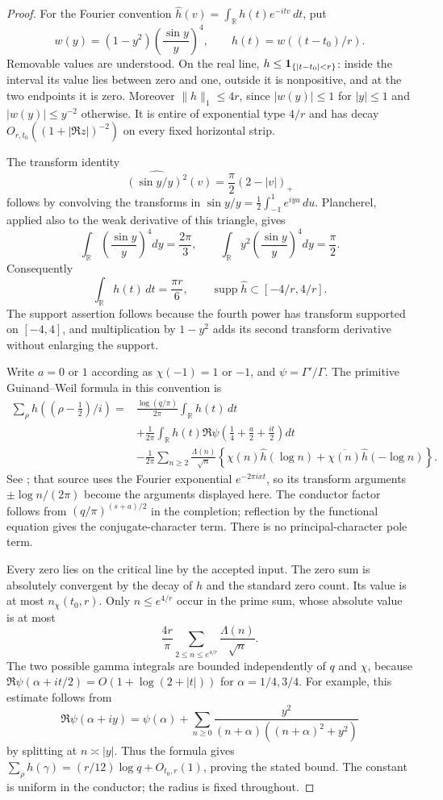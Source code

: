 \begin{proof}
For the Fourier convention
$\widehat h(v)=\int_{\mathbb R}h(t)e^{-itv}\,dt$, put
\[
 w(y)=(1-y^2)\left(\frac{\sin y}{y}\right)^4,\qquad
 h(t)=w((t-t_0)/r).
\]
Removable values are understood. On the real line,
$h\le{\bf1}_{\{|t-t_0|<r\}}$: inside the interval its value
lies between zero and one, outside it is nonpositive, and at
the two endpoints it is zero. Moreover $\|h\|_1\le4r$, since
$|w(y)|\le1$ for $|y|\le1$ and $|w(y)|\le y^{-2}$ otherwise.
It is entire of exponential type $4/r$ and has decay
$O_{r,t_0}((1+|\Re z|)^{-2})$ on every fixed horizontal strip.

The transform identity
\[
 \widehat{(\sin y/y)^2}(v)=\frac\pi2(2-|v|)_+
\]
follows by convolving the transforms in
$\sin y/y=\frac12\int_{-1}^1e^{iyu}\,du$.
Plancherel, applied also to the weak derivative of this
triangle, gives
\[
 \int_{\mathbb R}\left(\frac{\sin y}{y}\right)^4dy
   =\frac{2\pi}{3},\qquad
 \int_{\mathbb R}y^2\left(\frac{\sin y}{y}\right)^4dy
   =\frac\pi2.
\]
Consequently
\[
 \int_{\mathbb R}h(t)\,dt=\frac{\pi r}{6},\qquad
 \operatorname{supp}\widehat h\subset[-4/r,4/r].
\]
The support assertion follows because the fourth power has
transform supported on $[-4,4]$, and multiplication by
$1-y^2$ adds its second transform derivative without
enlarging the support.

Write $a=0$ or $1$ according as $\chi(-1)=1$ or $-1$, and
$\psi=\Gamma'/\Gamma$. The primitive Guinand--Weil formula
in this convention is
\begin{align*}
 \sum_\rho h((\rho-\tfrac12)/i)
 ={}&\frac{\log(q/\pi)}{2\pi}\int_{\mathbb R}h(t)\,dt\\
 &+\frac1{2\pi}\int_{\mathbb R}h(t)
       \Re\psi\left(\frac14+\frac a2+\frac{it}{2}\right)dt\\
 &-\frac1{2\pi}\sum_{n\ge2}\frac{\Lambda(n)}{\sqrt n}
   \left\{\chi(n)\widehat h(\log n)
       +\overline{\chi(n)}\widehat h(-\log n)\right\}.
\end{align*}
See \cite[Section~2.1, equation~(2.1), p.~3]{chirre-pereira-delaat2021};
that source uses the Fourier exponential $e^{-2\pi ixt}$,
so its transform arguments $\pm\log n/(2\pi)$ become the
arguments displayed here. The conductor factor follows
from $(q/\pi)^{(s+a)/2}$ in the completion; reflection by
the functional equation gives the conjugate-character
term. There is no principal-character pole term.

Every zero lies on the critical line by the accepted input.
The zero sum is absolutely convergent by the decay of $h$
and the standard zero count. Its value is at most
$n_\chi(t_0,r)$. Only $n\le e^{4/r}$ occur in the prime sum,
whose absolute value is at most
\[
 \frac{4r}{\pi}\sum_{2\le n\le e^{4/r}}
                       \frac{\Lambda(n)}{\sqrt n}.
\]
The two possible gamma integrals are bounded independently
of $q$ and $\chi$, because
$\Re\psi(\alpha+it/2)=O(1+\log(2+|t|))$ for
$\alpha=1/4,3/4$. For example, this estimate follows from
\[
 \Re\psi(\alpha+iy)=\psi(\alpha)+
 \sum_{n\ge0}\frac{y^2}
 {(n+\alpha)((n+\alpha)^2+y^2)}
\]
by splitting at $n\asymp |y|$. Thus the formula gives
$\sum_\rho h(\gamma)=(r/12)\log q+O_{t_0,r}(1)$, proving
the stated bound. The constant is uniform in the conductor;
the radius is fixed throughout.


\end{proof}
